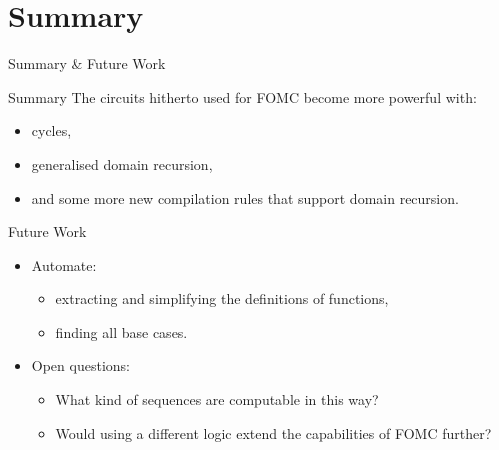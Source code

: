 \documentclass{beamer}
\begin{document}
\section{Summary}

\begin{frame}{Summary \& Future Work}
  \begin{block}{Summary}
    The circuits hitherto used for FOMC become more powerful with:
    \begin{itemize}
    \item cycles,
    \item generalised domain recursion,
    \item and some more new compilation rules that support domain recursion.
    \end{itemize}
  \end{block}
  \begin{block}{Future Work}
    \begin{itemize}
    \item Automate:
      \begin{itemize}
      \item extracting and simplifying the definitions of functions,
      \item finding all base cases.
      \end{itemize}
    \item Open questions:
      \begin{itemize}
      \item What kind of \alert{sequences} are computable in this way?
      \item Would using a \alert{different logic} extend the capabilities of FOMC further?
      \end{itemize}
    \end{itemize}
  \end{block}
\end{frame}
\end{document}
